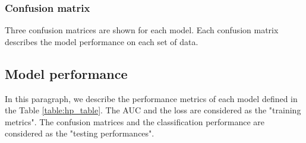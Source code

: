 \subsubsection{Confusion matrix}
Three confusion matrices are shown for each model. Each confusion matrix describes the model performance on each set of data.

\subsection{Model performance}
In this paragraph, we describe the performance metrics of each model defined in the Table \ref{table:hp_table}.
The AUC and the loss are considered as the "training metrics". The confusion matrices and the classification performance are considered as the "testing performances".

